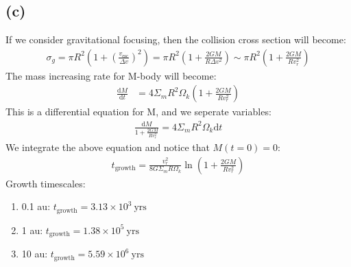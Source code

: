\documentclass[a4paper,12pt]{article}
\renewcommand{\d}{\mathrm{d}}
\begin{document}
\subsection*{(c)}
If we consider gravitational focusing, then the collision cross section will become:
\begin{align*}
    \sigma_g = \pi R^2 (1+(\frac{v_\text{esc}}{\Delta v})^2) = \pi R^2 (1 + \frac{2GM}{R \Delta v^2}) \sim \pi R^2 (1 + \frac{2GM}{R v_r^2})
\end{align*}
The mass increasing rate for M-body will become:
\begin{align*}
    \frac{\d M}{\d t} &= 4 \Sigma_m R^2 \Omega_k (1 + \frac{2GM}{R v_r^2})
\end{align*}
This is a differential equation for M, and we seperate variables:
\begin{align*}
    \frac{\d M}{1 + \frac{2GM}{R v_r^2}} = 4 \Sigma_m R^2 \Omega_k \d t
\end{align*}
We integrate the above equation and notice that $M(t=0)=0$:
\begin{align*}
    t_\text{growth} = \frac{v_r^2}{8G\Sigma_m R \Omega_k} \ln (1+\frac{2GM}{R v_r^2}) 
\end{align*}
Growth timescales:
\begin{enumerate}
    \item[] 0.1 au: $t_\text{growth} = 3.13 \times 10^3 \ \text{yrs}$
    \item[] 1 au: $t_\text{growth} = 1.38 \times 10^5 \ \text{yrs}$ 
    \item[] 10 au: $t_\text{growth} = 5.59 \times 10^6 \ \text{yrs}$ 
\end{enumerate}
\end{document}
